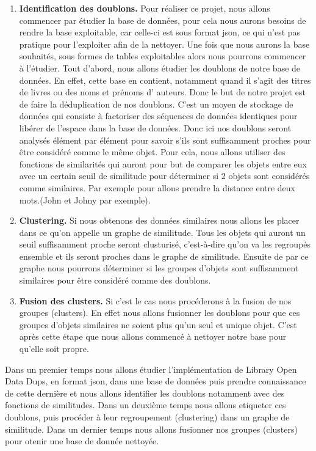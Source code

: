 \documentclass[12pt, a4paper]{article}
\begin{document}
\begin{enumerate}
\item \textbf{Identification des doublons.} Pour réaliser ce projet, nous allons commencer par étudier la base de données, pour cela nous aurons besoins de rendre la base exploitable, car celle-ci est sous format json, ce qui n’est pas pratique pour l’exploiter afin de la nettoyer. Une fois que nous aurons la base souhaités, sous formes de tables exploitables alors nous pourrons commencer à l’étudier.
Tout d’abord, nous allons  étudier les doublons de notre base de données. En effet, cette base en contient, notamment quand il s'agit des titres de livres ou des noms et prénoms d' auteurs. Donc le but de notre projet est de faire la déduplication de nos doublons. C’est un moyen de stockage de données qui consiste à  factoriser des séquences de données identiques pour libérer de l’espace dans la base de données. Donc ici nos doublons seront analysés élément par élément pour savoir s’ils sont suffisamment proches pour être considéré comme le même objet.
Pour cela, nous allons utiliser des fonctions de similarités qui auront pour but de comparer les objets entre eux avec un certain seuil de similitude pour déterminer si 2 objets sont considérés comme similaires. Par exemple pour allons prendre la distance entre deux mots.(John et Johny par exemple).



\item \textbf{Clustering.}
Si nous obtenons des données similaires nous allons les placer dans ce qu’on appelle un graphe de similitude. Tous les objets qui auront un seuil suffisamment proche seront clusturisé, c’est-à-dire qu’on va les regroupés ensemble et ils seront proches dans le graphe de similitude. Ensuite de par ce  graphe nous pourrons déterminer si les groupes d’objets sont suffisamment similaires pour être considéré comme des doublons.


\item \textbf{Fusion des clusters.} Si c’est le cas nous procéderons à la fusion de nos groupes (clusters). En effet nous allons fusionner les doublons pour que ces groupes d’objets similaires ne soient plus qu’un seul et unique objet. C'est après cette étape que nous allons commencé à nettoyer notre base pour qu'elle soit propre. 


\end{enumerate}


Dans un premier temps nous allons étudier l'implémentation de Library Open Data Dups, en format json, dans une base de données puis prendre connaissance de cette dernière et nous allons identifier les doublons notamment avec des fonctions de similitudes.
Dans un deuxième temps nous allons etiqueter ces doublons, puis procéder à leur regroupement (clustering) dans un graphe de similitude.
Dans un dernier temps nous allons fusionner nos groupes (clusters) pour otenir une base de donnée nettoyée.

\cite{Fan15}
\cite{SuNo00}
\cite{galhardas:inria-00072476}
\cite{10.5555/1841211}



\end{document}
